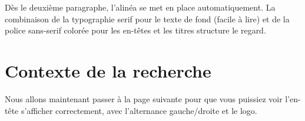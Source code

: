 \documentclass[12pt, a4paper, twoside]{report}
\begin{document}
Dès le deuxième paragraphe, l'alinéa se met en place automatiquement. La combinaison de la typographie serif pour le texte de fond (facile à lire) et de la police sans-serif colorée pour les en-têtes et les titres structure le regard.

\section{Contexte de la recherche}
Nous allons maintenant passer à la page suivante pour que vous puissiez voir l'en-tête s'afficher correctement, avec l'alternance gauche/droite et le logo.

\lipsum[1-6] 
\end{document}
